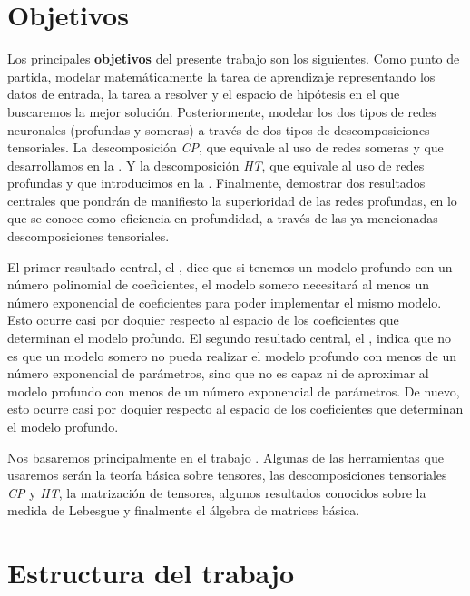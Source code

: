 \section{Objetivos}

Los principales \textbf{objetivos} del presente trabajo son los siguientes. Como punto de partida, modelar matemáticamente la tarea de aprendizaje representando los datos de entrada, la tarea a resolver y el espacio de hipótesis en el que buscaremos la mejor solución. Posteriormente, modelar los dos tipos de redes neuronales (profundas y someras) a través de dos tipos de descomposiciones tensoriales. La descomposición \textit{CP}, que equivale al uso de redes someras y que desarrollamos en la . Y la descomposición \textit{HT}, que equivale al uso de redes profundas y que introducimos en la . Finalmente, demostrar dos resultados centrales que pondrán de manifiesto la superioridad de las redes profundas, en lo que se conoce como eficiencia en profundidad, a través de las ya mencionadas descomposiciones tensoriales.

El primer resultado central, el , dice que si tenemos un modelo profundo con un número polinomial de coeficientes, el modelo somero necesitará al menos un número exponencial de coeficientes para poder implementar el mismo modelo. Esto ocurre casi por doquier respecto al espacio de los coeficientes que determinan el modelo profundo. El segundo resultado central, el , indica que no es que un modelo somero no pueda realizar el modelo profundo con menos de un número exponencial de parámetros, sino que no es capaz ni de aproximar al modelo profundo con menos de un número exponencial de parámetros. De nuevo, esto ocurre casi por doquier respecto al espacio de los coeficientes que determinan el modelo profundo.

Nos basaremos principalmente en el trabajo \cite{matematicas:principal}. Algunas de las herramientas que usaremos serán la teoría básica sobre tensores, las descomposiciones tensoriales \textit{CP} y \textit{HT}, la matrización de tensores, algunos resultados conocidos sobre la medida de Lebesgue y finalmente el álgebra de matrices básica.

\section{Estructura del trabajo}

